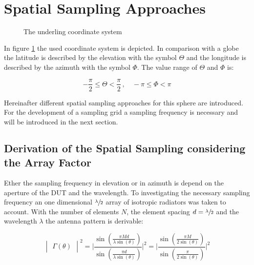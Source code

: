 \section{Spatial Sampling Approaches}

\begin{figure}[H]
\centering
\def\svgwidth{0.4\textwidth}

\caption{The underling coordinate system}
\label{coordinates}
\end{figure}

In figure \ref{coordinates} the used coordinate system is depicted. In comparison with a globe the latitude is described by the elevation with the symbol $\Theta$ and the longitude is described by the azimuth with the symbol $\Phi$. The value range of $\Theta$ and $\Phi$ is:

\begin{equation}
-\frac{\pi}{2} \leq \Theta <\frac{\pi}{2}\, ,\quad -\pi \leq \Phi < \pi
\end{equation}

Hereinafter different spatial sampling approaches for this sphere are introduced. For the development of a sampling grid a sampling frequency is necessary and will be introduced in the next section.

\subsection{Derivation of the Spatial Sampling considering the Array Factor}

Ether the sampling frequency in elevation or in azimuth is depend on the aperture of the \ac{DUT} and the wavelength. To investigating the necessary sampling frequency an one dimensional $\sfrac{\lambda}{2}$ array of isotropic radiators was taken to account. With the number of elements $N$, the element spacing $d = \sfrac{\lambda}{2}$ and the wavelength $\lambda$ the antenna pattern is derivable: \cite{litze}

\begin{equation}
\begin{vmatrix}\Gamma\left(\theta\right)\end{vmatrix}^2 = \Biggl|\frac{\sin\left(\frac{\pi M d}{\lambda \sin\left(\theta\right)}\right)}{\sin\left(\frac{\pi d}{\lambda \sin\left(\theta\right)}\right)}\Biggl|^2 = \Biggl|\frac{\sin\left(\frac{\pi M}{2 \sin\left(\theta\right)}\right)}{\sin\left(\frac{\pi}{2 \sin\left(\theta\right)}\right)}\Biggl|^2
\end{equation}

